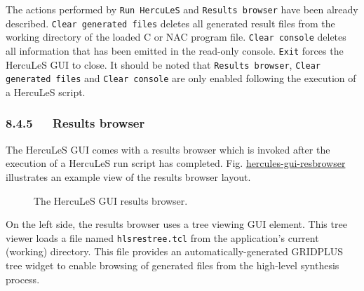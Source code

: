 \documentclass[a4paper]{article}
\begin{document}
The actions performed by \texttt{Run HercuLeS} and \texttt{Results browser} have been already described. \texttt{Clear generated files} deletes all generated result files from the working directory of the loaded C or NAC program file. \texttt{Clear console} deletes all  information that has been emitted in the read-only console. \texttt{Exit} forces the HercuLeS GUI to close. It should be noted that \texttt{Results browser}, \texttt{Clear generated files} and \texttt{Clear console} are only enabled following the execution of a HercuLeS script.


\subsubsection{8.4.5~~~Results browser%
  \label{results-browser}%
}

The HercuLeS GUI comes with a results browser which is invoked after the execution of a HercuLeS run script has completed. Fig. \hyperref[hercules-gui-resbrowser]{hercules-gui-resbrowser} illustrates an example view of the results browser layout.
\begin{figure}
\label{hercules-gui-resbrowser}
\noindent{}
\caption{The HercuLeS GUI results browser.}
\end{figure}

On the left side, the results browser uses a tree viewing GUI element. This tree viewer loads a file named \texttt{hlsrestree.tcl} from the application's current (working) directory. This file provides an automatically-generated GRIDPLUS tree widget to enable browsing of generated files from the high-level synthesis process.
\end{document}
